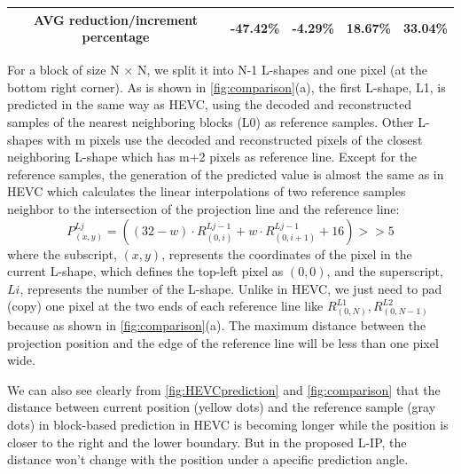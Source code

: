 \documentclass[journal]{IEEEtran}
\begin{document}
\begin{table}[]
\begin{tabular}{c|c|cc|cc|cc|cc}
        \multicolumn{2}{c|}{AVG reduction/increment percentage} & \multicolumn{2}{c|}{-47.42\%} & \multicolumn{2}{c|}{-4.29\%} & \multicolumn{2}{c|}{18.67\%} & \multicolumn{2}{c}{33.04\%}                                                                      \\ \bottomrule
    \end{tabular}
\end{table}

For a block of size N × N, we split it into N-1 L-shapes and one pixel (at the bottom right corner). As is shown in \autoref{fig:comparison}(a), the first L-shape, L1, is predicted in the same way as HEVC, using the decoded and reconstructed samples of the nearest neighboring blocks (L0) as reference samples. Other L-shapes with m pixels use the decoded and reconstructed pixels of the closest neighboring L-shape which has m+2 pixels as reference line. Except for the reference samples, the generation of the predicted value is almost the same as in HEVC which calculates the linear interpolations of two reference samples neighbor to the intersection of the projection line and the reference line:
\begin{equation}
    P_{(x,y)}^{Lj} =((32-w)\cdot R_{(0,i)}^{Lj-1} +w\cdot R_{(0,i+1)}^{Lj-1} +16)>>5
\end{equation}
where the subscript, $(x,y)$, represents the coordinates of the pixel in the current L-shape, which defines the top-left pixel as $(0,0)$, and the superscript, $Li$, represents the number of the L-shape.
Unlike in HEVC, we just need to pad (copy) one pixel at the two ends of each reference line like $R_{(0,N)}^{L1},R_{(0,N-1)}^{L2}$ because as shown in \autoref{fig:comparison}(a). The maximum distance between the projection position and the edge of the reference line will be less than one pixel wide.

We can also see clearly from \autoref{fig:HEVCprediction} and \autoref{fig:comparison} that the distance between current position (yellow dots) and the reference sample (gray dots) in block-based prediction in HEVC is becoming longer while the position is closer to the right and the lower boundary. But in the proposed L-IP, the distance won't change with the position under a apecific prediction angle.
\end{document}
